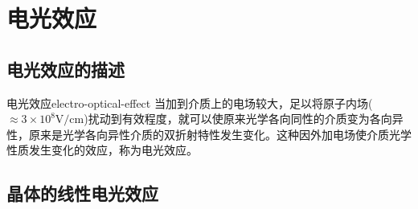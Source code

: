 \documentclass[cn,10pt,chinesefont=founder,math=mtpro2,cite=super,toc=onecol,twoside]{elegantbook}
\begin{document}
\section{电光效应}

\subsection{电光效应的描述}

\begin{definition}{电光效应}{electro-optical-effect}
	当加到介质上的电场较大，足以将原子内场($\approx3\times10^8\mathrm{V/cm}$)扰动到有效程度，就可以使原来光学各向同性的介质变为各向异性，原来是光学各向异性介质的双折射特性发生变化。这种因外加电场使介质光学性质发生变化的效应，称为电光效应。
\end{definition}

\subsection{晶体的线性电光效应}
\end{document}
